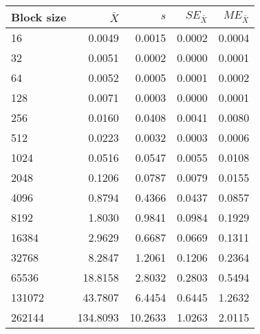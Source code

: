 \begin{tabular}{lrrrr}\toprule
{\small Block size} & $\bar{X}$ & $s$ & $SE_{\bar{X}}$ & $ME_{\bar{X}}$ \\\midrule
16 & 0.0049 & 0.0015 & 0.0002 & 0.0004\\
32 & 0.0051 & 0.0002 & 0.0000 & 0.0001\\
64 & 0.0052 & 0.0005 & 0.0001 & 0.0002\\
128 & 0.0071 & 0.0003 & 0.0000 & 0.0001\\
256 & 0.0160 & 0.0408 & 0.0041 & 0.0080\\
512 & 0.0223 & 0.0032 & 0.0003 & 0.0006\\
1024 & 0.0516 & 0.0547 & 0.0055 & 0.0108\\
2048 & 0.1206 & 0.0787 & 0.0079 & 0.0155\\
4096 & 0.8794 & 0.4366 & 0.0437 & 0.0857\\
8192 & 1.8030 & 0.9841 & 0.0984 & 0.1929\\
16384 & 2.9629 & 0.6687 & 0.0669 & 0.1311\\
32768 & 8.2847 & 1.2061 & 0.1206 & 0.2364\\
65536 & 18.8158 & 2.8032 & 0.2803 & 0.5494\\
131072 & 43.7807 & 6.4454 & 0.6445 & 1.2632\\
262144 & 134.8093 & 10.2633 & 1.0263 & 2.0115\\
\bottomrule
\end{tabular}
